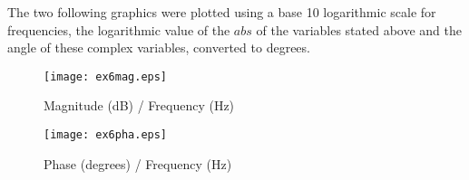 The two following graphics were plotted using a base 10 logarithmic scale for frequencies, the logarithmic value of the $abs$ of the variables stated above and the angle of these complex variables, converted to degrees.



\begin{figure}[H]
    \texttt{[image: ex6mag.eps]}
    \centering
    \caption{Magnitude (dB) / Frequency (Hz)}
    \label{mag}
\end{figure}

\begin{figure}[H]
    \texttt{[image: ex6pha.eps]}
    \centering
    \caption{Phase (degrees) / Frequency (Hz)}
    \label{pha}
\end{figure}


